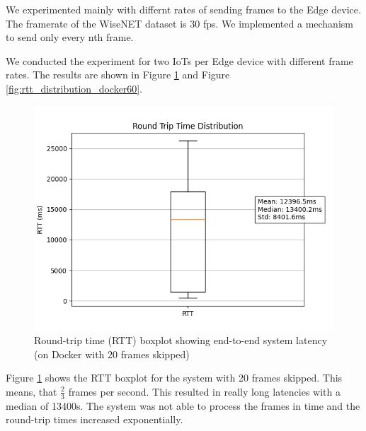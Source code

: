\documentclass[conference]{IEEEtran}
\begin{document}
We experimented mainly with differnt rates of sending frames to the Edge device. The framerate of the WiseNET dataset is 30 fps. We implemented a mechanism to send only every nth frame.

We conducted the experiment for two IoTs per Edge device with different frame rates. The results are shown in Figure \ref{fig:rtt_distribution_docker20} and Figure \ref{fig:rtt_distribution_docker60}.

\begin{figure}[!h]
    \centering
    \includegraphics[width=1\linewidth]{./res/rtt_distribution-local_docker_test20skip.png}
    \caption{Round-trip time (RTT) boxplot showing end-to-end system latency (on Docker with 20 frames skipped)}
    \label{fig:rtt_distribution_docker20}
\end{figure}

Figure \ref{fig:rtt_distribution_docker20} shows the RTT boxplot for the system with 20 frames skipped. This means, that $\frac{2}{3}$ frames per second.
This resulted in really long latencies with a median of 13400s. The system was not able to process the frames in time and the round-trip times increased exponentially. 
\end{document}
